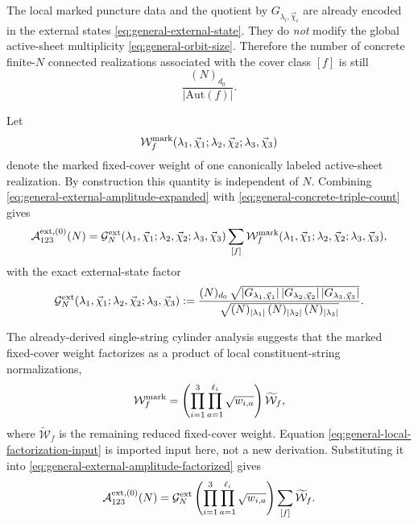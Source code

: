 \documentclass[11pt]{article}
\newcommand{\mc}[1]{\mathcal{#1}}
\newcommand{\Aut}{\mathrm{Aut}}
\begin{document}
The local marked puncture data and the quotient by $G_{\lambda_i,\vec\chi_i}$ are already encoded in the external states \eqref{eq:general-external-state}. They do \emph{not} modify the global active-sheet multiplicity \eqref{eq:general-orbit-size}. Therefore the number of concrete finite-$N$ connected realizations associated with the cover class $[f]$ is still
\begin{equation}\label{eq:general-concrete-triple-count}
\frac{(N)_{d_0}}{|\Aut(f)|}.
\end{equation}

Let
\begin{equation}\label{eq:general-marked-cover-weight}
\mc W_f^{\rm mark}(\lambda_1,\vec\chi_1;\lambda_2,\vec\chi_2;\lambda_3,\vec\chi_3)
\end{equation}
denote the marked fixed-cover weight of one canonically labeled active-sheet realization. By construction this quantity is independent of $N$. Combining \eqref{eq:general-external-amplitude-expanded} with \eqref{eq:general-concrete-triple-count} gives
\begin{equation}\label{eq:general-external-amplitude-factorized}
\mc A_{123}^{\rm ext,(0)}(N)
=
\mc G_N^{\rm ext}(\lambda_1,\vec\chi_1;\lambda_2,\vec\chi_2;\lambda_3,\vec\chi_3)
\sum_{[f]}
\mc W_f^{\rm mark}(\lambda_1,\vec\chi_1;\lambda_2,\vec\chi_2;\lambda_3,\vec\chi_3),
\end{equation}
with the exact external-state factor
\begin{equation}\label{eq:general-derived-external-factor}
\mc G_N^{\rm ext}(\lambda_1,\vec\chi_1;\lambda_2,\vec\chi_2;\lambda_3,\vec\chi_3)
:=
\frac{(N)_{d_0}\,
\sqrt{
|G_{\lambda_1,\vec\chi_1}|\,
|G_{\lambda_2,\vec\chi_2}|\,
|G_{\lambda_3,\vec\chi_3}|
}
}{
\sqrt{
(N)_{|\lambda_1|}\,
(N)_{|\lambda_2|}\,
(N)_{|\lambda_3|}
}
}.
\end{equation}

The already-derived single-string cylinder analysis suggests that the marked fixed-cover weight factorizes as a product of local constituent-string normalizations,
\begin{equation}\label{eq:general-local-factorization-input}
\mc W_f^{\rm mark}
=
\left(
\prod_{i=1}^3
\prod_{a=1}^{\ell_i}
\sqrt{w_{i,a}}
\right)
\widetilde{\mc W}_f,
\end{equation}
where $\widetilde{\mc W}_f$ is the remaining reduced fixed-cover weight. Equation \eqref{eq:general-local-factorization-input} is imported input here, not a new derivation. Substituting it into \eqref{eq:general-external-amplitude-factorized} gives
\begin{equation}\label{eq:general-external-amplitude-local-factor}
\mc A_{123}^{\rm ext,(0)}(N)
=
\mc G_N^{\rm ext}
\left(
\prod_{i=1}^3
\prod_{a=1}^{\ell_i}
\sqrt{w_{i,a}}
\right)
\sum_{[f]}
\widetilde{\mc W}_f.
\end{equation}
\end{document}
